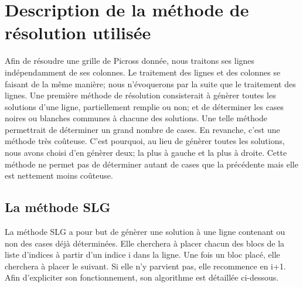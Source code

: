 \documentclass{article}
\begin{document}
\section{Description de la m\'ethode de r\'esolution utilis\'ee}
Afin de r\'esoudre une grille de Picross donn\'ee, nous traitons ses lignes ind\'ependamment de ses colonnes. 
Le traitement des lignes et des colonnes se faisant de la m\^eme mani\`ere; nous n'\'evoquerons par la suite que le traitement des lignes.
\newline
Une premi\`ere m\'ethode de r\'esolution consisterait \`a g\'en\`erer toutes les solutions d'une ligne, partiellement remplie ou non; et de d\'eterminer les cases noires ou blanches communes \`a chacune des solutions.
\newline
Une telle m\'ethode permettrait de d\'eterminer un grand nombre de cases. En revanche, c'est une m\'ethode tr\`es co\^uteuse.
\newline
C'est pourquoi, au lieu de g\'en\`erer toutes les solutions, nous avons choisi d'en g\'en\`erer deux; la plus \`a gauche et la plus \`a droite. Cette m\'ethode ne permet pas de d\'eterminer autant de cases que la pr\'ec\'edente mais elle est nettement moins co\^uteuse.
\subsection{La m\'ethode SLG}
La m\'ethode SLG a pour but de g\'en\`erer une solution \`a une ligne contenant ou non des cases d\'ej\`a d\'etermin\'ees.
Elle cherchera \`a placer chacun des blocs de la liste d'indices \`a partir d'un indice i dans la ligne.
Une fois un bloc plac\'e, elle cherchera \`a placer le suivant. Si elle n'y parvient pas, elle recommence en i+1.
Afin d'expliciter son fonctionnement, son algorithme est d\'etaill\'ee ci-dessous.
\end{document}
